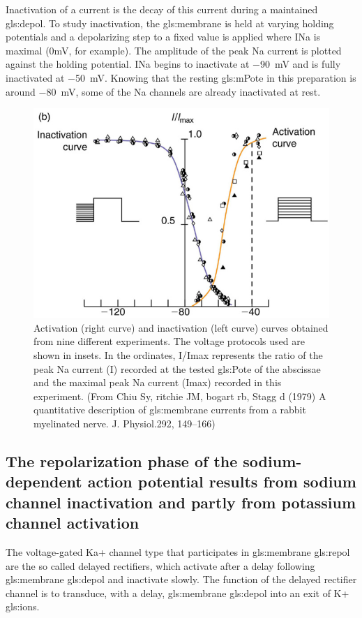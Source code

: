 \documentclass[class={.NoTouch/myProject}, crop=false]{standalone}
\begin{document}
Inactivation of a current is the decay of this current during a maintained \gls{gls:depol}. To study inactivation, the \gls{gls:membrane} is held at varying holding potentials and a depolarizing step to a fixed value is applied where INa is maximal (0mV, for example). The amplitude of the peak \gls{Na} current is plotted against the holding potential. INa begins to inactivate at \qty{-90}{\mV} and is fully inactivated at \qty{-50}{\mV}. Knowing that the resting \gls{gls:mPote} in this preparation is around \qty{-80}{\mV}, some of the \gls{Na} channels are already inactivated at rest. 
\begin{figure}[H]
    \centering
    \includegraphics[width=0.5\linewidth]{Pictures//Anakin/activ-inactiv.png}
    \caption{Activation (right curve) and inactivation (left curve) curves obtained from nine different experiments. The voltage protocols used are shown in insets. In the ordinates, I/Imax represents the ratio of the peak \gls{Na} current (I) recorded at the tested \gls{gls:Pote} of the abscissae and the maximal peak \gls{Na} current (Imax) recorded in this experiment. (From Chiu Sy, ritchie JM, bogart rb, Stagg d (1979) A quantitative description of \gls{gls:membrane} currents from a rabbit myelinated nerve. J. Physiol.292, 149–166) }
    \label{fig:enter-label}
\end{figure}

\subsection{The repolarization phase of the sodium-dependent action potential results from sodium channel inactivation and partly from potassium channel activation}

The voltage-gated Ka+ channel type that participates in \gls{gls:membrane} \gls{gls:repol} are the so called delayed rectifiers, which activate after a delay following \gls{gls:membrane} \gls{gls:depol} and inactivate slowly. The function of the delayed rectifier channel is to transduce, with a delay, \gls{gls:membrane} \gls{gls:depol} into an exit of K+ \glspl{gls:ion}. 
\end{document}
